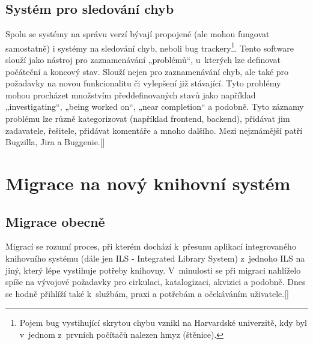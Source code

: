 \documentclass[
	11pt, oneside, printed, draft, 
	table,   %
	lof,     %
	lot     %
]{fithesis3}
\newcommand{\citepages}[2]{[\cite[#1]{#2}]}
\begin{document}
{\subsection{Systém pro sledování chyb}
Spolu se systémy na správu verzí bývají propojené (ale mohou fungovat samostatně) i systémy na sledování chyb, neboli bug trackery\footnote{Pojem bug vystihující skrytou chybu vznikl na Harvardské univerzitě, kdy byl v~jednom z~prvních počítačů nalezen hmyz (štěnice).}. Tento software slouží jako nástroj pro zaznamenávání „problémů“, u~kterých lze definovat počáteční a koncový stav. Slouží nejen pro zaznamenávání chyb, ale také pro požadavky na novou funkcionalitu či vylepšení již stávající. Tyto problémy mohou procházet množstvím předdefinovaných stavů jako například „investigating“, „being worked on“, „near completion“ a podobně. Tyto záznamy problému lze různě kategorizovat (například frontend, backend), přidávat jim zadavatele, řešitele, přidávat komentáře a mnoho dalšího. Mezi nejznámější patří Bugzilla, Jira a Buggenie.\citepages{99-104}{Fogel2012}

\section{Migrace na nový knihovní systém}

\subsection{Migrace obecně}

Migrací se rozumí proces, při kterém dochází k~přesunu aplikací integrovaného knihovního systému (dále jen ILS - Integrated Library System) z~jednoho ILS na jiný, který lépe vystihuje potřeby knihovny. V~minulosti se při migraci nahlíželo spíše na vývojové požadavky pro cirkulaci, katalogizaci, akvizici a podobně. Dnes se hodně přihlíží také k~službám, praxi a potřebám a očekáváním uživatele.\citepages{151-152}{bilal_2014}

}
\end{document}
